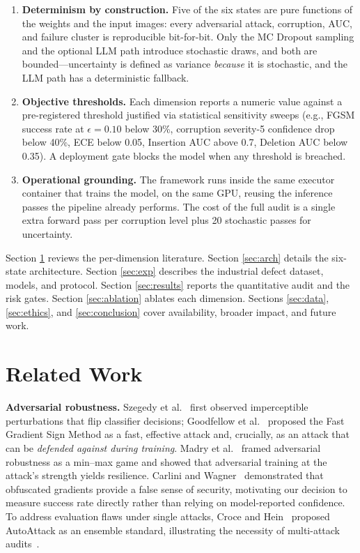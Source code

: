 \documentclass[10pt,twocolumn,letterpaper]{article}
\begin{document}
\begin{enumerate}
    \item \textbf{Determinism by construction.} Five of the six states are pure functions of the weights and the input images: every adversarial attack, corruption, AUC, and failure cluster is reproducible bit-for-bit. Only the MC Dropout sampling and the optional LLM path introduce stochastic draws, and both are bounded---uncertainty is defined as variance \emph{because} it is stochastic, and the LLM path has a deterministic fallback.
    \item \textbf{Objective thresholds.} Each dimension reports a numeric value against a pre-registered threshold justified via statistical sensitivity sweeps (e.g., FGSM success rate at $\epsilon=0.10$ below 30\%, corruption severity-5 confidence drop below 40\%, ECE below 0.05, Insertion AUC above 0.7, Deletion AUC below 0.35). A deployment gate blocks the model when any threshold is breached.
    \item \textbf{Operational grounding.} The framework runs inside the same executor container that trains the model, on the same GPU, reusing the inference passes the pipeline already performs. The cost of the full audit is a single extra forward pass per corruption level plus 20 stochastic passes for uncertainty.
\end{enumerate}

Section \ref{sec:related} reviews the per-dimension literature. Section \ref{sec:arch} details the six-state architecture. Section \ref{sec:exp} describes the industrial defect dataset, models, and protocol. Section \ref{sec:results} reports the quantitative audit and the risk gates. Section \ref{sec:ablation} ablates each dimension. Sections \ref{sec:data}, \ref{sec:ethics}, and \ref{sec:conclusion} cover availability, broader impact, and future work.

\section{Related Work}
\label{sec:related}
\textbf{Adversarial robustness.} Szegedy et al.~\cite{szegedy2014intriguing} first observed imperceptible perturbations that flip classifier decisions; Goodfellow et al.~\cite{goodfellow2015fgsm} proposed the Fast Gradient Sign Method as a fast, effective attack and, crucially, as an attack that can be \emph{defended against during training}. Madry et al.~\cite{madry2018towards} framed adversarial robustness as a min--max game and showed that adversarial training at the attack's strength yields resilience. Carlini and Wagner~\cite{carlini2017towards} demonstrated that obfuscated gradients provide a false sense of security, motivating our decision to measure success rate directly rather than relying on model-reported confidence. To address evaluation flaws under single attacks, Croce and Hein~\cite{croce2020reliable} proposed AutoAttack as an ensemble standard, illustrating the necessity of multi-attack audits~\cite{silva2020opportunities}.
\end{document}
